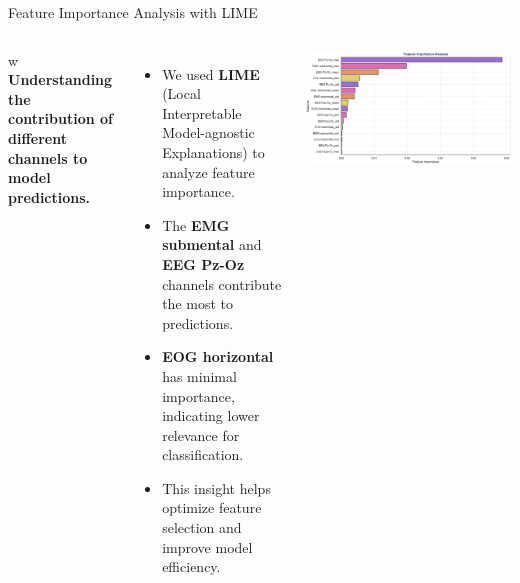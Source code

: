 \begin{frame}{Feature Importance Analysis with LIME}

    \begin{columns}

        w
        \textbf{Understanding the contribution of different channels to model predictions.}

        \begin{itemize}
            \item We used \textbf{LIME} (Local Interpretable Model-agnostic Explanations) to analyze feature importance.
            \item The \textbf{EMG submental} and \textbf{EEG Pz-Oz} channels contribute the most to predictions.
            \item \textbf{EOG horizontal} has minimal importance, indicating lower relevance for classification.
            \item This insight helps optimize feature selection and improve model efficiency.
        \end{itemize}

        \centering
        \includegraphics[width=0.9\linewidth]{images/paper_3/feature importance chanels analysis.png} %

    \end{columns}

\end{frame}


